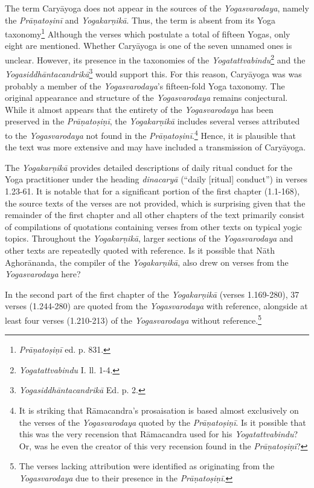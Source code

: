 The term Caryāyoga does not appear in the sources of the \textit{Yogasvarodaya}, namely the \textit{Prāṇatoṣinī} and \textit{Yogakarṇikā}. Thus, the term is absent from its Yoga taxonomy\footnote{\textit{Prāṇatoṣiṇī} ed. p. 831.} Although the verses which postulate a total of fifteen Yogas, only eight are mentioned. Whether Caryāyoga is one of the seven unnamed ones is unclear. However, its presence in the taxonomies of the \textit{Yogatattvabindu}\footnote{\textit{Yogatattvabindu} I. ll. 1-4.} and the \textit{Yogasiddhāntacandrikā}\footnote{\textit{Yogasiddhāntacandrikā} Ed. p. 2.} would support this. For this reason, Caryāyoga was was probably a member of the \textit{Yogasvarodaya}'s fifteen-fold Yoga taxonomy. The original appearance and structure of the \textit{Yogasvarodaya} remains conjectural. While it almost appears that the entirety of the \textit{Yogasvarodaya} has been preserved in the \textit{Prāṇatoṣiṇī}, the \textit{Yogakarṇikā} includes several verses attributed to the \textit{Yogasvarodaya} not found in the \textit{Prāṇatoṣinī}.\footnote{It is striking that Rāmacandra's prosaisation is based almost exclusively on the verses of the \textit{Yogasvarodaya} quoted by the \textit{Prāṇatoṣiṇī}. Is it possible that this was the very recension that Rāmacandra used for his \emph{Yogatattvabindu}? Or, was he even the creator of this very recension found in the \textit{Prāṇatoṣiṇī}?} Hence, it is plausible that the text was more extensive and may have included a transmission of Caryāyoga.

The \textit{Yogakarṇikā} provides detailed descriptions of daily ritual conduct for the Yoga practitioner under the heading \textit{dinacaryā} (``daily [ritual] conduct'') in verses 1.23-61. It is notable that for a significant portion of the first chapter (1.1-168), the source texts of the verses are not provided, which is surprising given that the remainder of the first chapter and all other chapters of the text primarily consist of compilations of quotations containing verses from other texts on typical yogic topics. Throughout the \textit{Yogakarṇikā}, larger sections of the \textit{Yogasvarodaya} and other texts are repeatedly quoted with reference. Is it possible that Nāth Aghorānanda, the compiler of the \textit{Yogakarṇikā}, also drew on verses from the \textit{Yogasvarodaya} here?

In the second part of the first chapter of the \textit{Yogakarṇikā} (verses 1.169-280), 37 verses (1.244-280) are quoted from the \textit{Yogasvarodaya} with reference, alongside at least four verses (1.210-213) of the \textit{Yogasvarodaya} without reference.\footnote{The verses lacking attribution were identified as originating from the \textit{Yogasvarodaya} due to their presence in the \textit{Prāṇatoṣiṇī}.}

